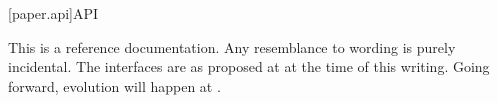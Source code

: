

[paper.api]{API}

\pnum
This is a reference documentation.
Any resemblance to wording is purely incidental.
The interfaces are as proposed at \hrefVII{} at the time of this writing.
Going forward, evolution will happen at \hrefXV{}.
